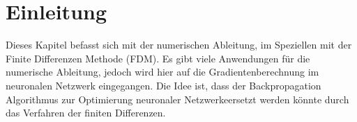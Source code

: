 %
%
%
\section{Einleitung\label{ableitung:section:einleitung}}
Dieses Kapitel befasst sich mit der numerischen Ableitung, im Speziellen mit der Finite Differenzen Methode (FDM).
Es gibt viele Anwendungen für die numerische Ableitung, jedoch wird hier auf die Gradientenberechnung im neuronalen Netzwerk eingegangen.
Die Idee ist, dass der Backpropagation Algorithmus zur Optimierung neuronaler Netzwerkeersetzt werden könnte durch das Verfahren der finiten Differenzen.

